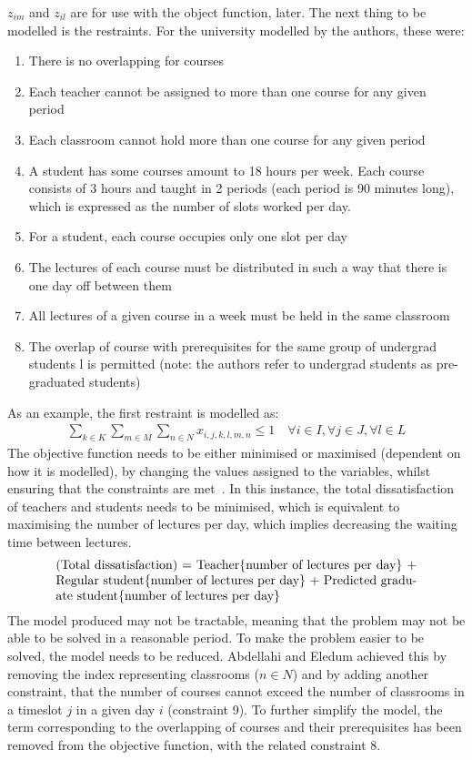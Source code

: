 \documentclass[a4paper, 12pt]{report}
\begin{document}
\( z_{im} \) and \( z_{il} \) are for use with the object function, later. The
next thing to be modelled is the restraints.
For the university modelled by the authors, these were:

\begin{enumerate}
	\item There is no overlapping for courses
	\item Each teacher cannot be assigned to more than one course for any given
		period
	\item Each classroom cannot hold more than one course for any given period
	\item A student has some courses amount to 18 hours per week. Each course
		consists of 3 hours and taught in 2 periods (each period is 90 minutes
		long), which is expressed as the number of slots worked per day.
	\item For a student, each course occupies only one slot per day
	\item The lectures of each course must be distributed in such a way that
		there is one day off between them
	\item All lectures of a given course in a week must be held in the same
		classroom
	\item The overlap of course with prerequisites for the same group of
		undergrad students l is permitted (note: the authors refer to undergrad 
		students as pre-graduated students)
\end{enumerate}

As an example, the first restraint is modelled as:
\begin{align*}
	\sum_{k \in K} \sum_{m \in M} \sum_{n \in N} x_{i,j,k,l,m,n} \leq 1 \quad
	\forall i \in I, \forall j \in J, \forall l \in L
\end{align*}
The objective function needs to be either minimised or maximised (dependent on
how it is modelled), by changing the values assigned to the variables, whilst
ensuring that the constraints are met~\cite{objective_function}.
In this instance, the total dissatisfaction of teachers and students needs to be
minimised, which is equivalent to maximising the number of lectures per day,
which implies decreasing the waiting time between lectures.
\begin{align*}
	\parbox[t]{10cm}{(Total dissatisfaction) = Teacher\{number of lectures per
	day\} + Regular student\{number of lectures per day\} + Predicted graduate
	student\{number of lectures per day\}}
\end{align*}
The model produced may not be tractable, meaning that the problem may not be
able to be solved in a reasonable period.
To make the problem easier to be solved, the model needs to be reduced.
Abdellahi and Eledum achieved this by removing the index representing
classrooms (\( n\in N \)) and by adding another constraint, that the number of
courses cannot exceed the number of classrooms in a timeslot \( j \) in a given
day \( i \) (constraint 9).
To further simplify the model, the term corresponding to the overlapping of
courses and their prerequisites has been removed from the objective function,
with the related constraint 8.
\end{document}
